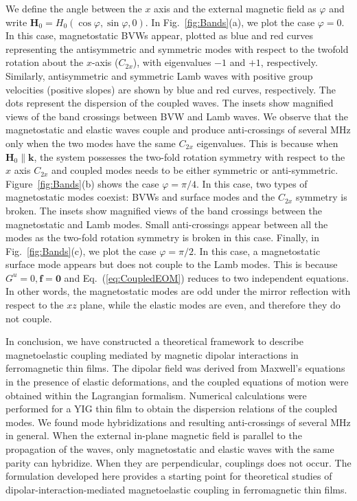 \documentclass[10pt]{iopart}
\begin{document}
We define the angle between the $x$ axis and the external magnetic field as $\varphi$ and write $\bm{H}_0=H_0(\cos\varphi,\sin\varphi,0)$. In Fig.~\ref{fig:Bands}(a), we plot the case $\varphi=0$. In this case, magnetostatic BVWs appear, plotted as blue and red curves representing the antisymmetric and symmetric modes with respect to the twofold rotation about the $x$-axis ($C_{2x}$), with eigenvalues $-1$ and $+1$, respectively. Similarly, antisymmetric and symmetric Lamb waves with positive group velocities (positive slopes) are shown by blue and red curves, respectively. The dots represent the dispersion of the coupled waves. The insets show magnified views of the band crossings between BVW and Lamb waves. We observe that the magnetostatic and elastic waves couple and produce anti-crossings of several MHz only when the two modes have the same $C_{2x}$ eigenvalues. This is because when $\bm{H}_0\parallel\bm{k}$, the system possesses the two-fold rotation symmetry with respect to the $x$ axis $C_{2x}$ and coupled modes needs to be either symmetric or anti-symmetric. Figure~\ref{fig:Bands}(b) shows the case $\varphi=\pi/4$. In this case, two types of magnetostatic modes coexist: BVWs and surface modes and the $C_{2x}$ symmetry is broken. The insets show magnified views of the band crossings between the magnetostatic and Lamb modes. Small anti-crossings appear between all the modes as the two-fold rotation symmetry is broken in this case. Finally, in Fig.~\ref{fig:Bands}(c), we plot the case $\varphi=\pi/2$. In this case, a magnetostatic surface mode appears but does not couple to the Lamb modes. This is because $G^u=0,\bm{f}=\bm{0}$ and Eq.~(\ref{eq:CoupledEOM}) reduces to two independent equations. In other words, the magnetostatic modes are odd under the mirror reflection with respect to the $xz$ plane, while the elastic modes are even, and therefore they do not couple.

In conclusion, we have constructed a theoretical framework to describe magnetoelastic coupling mediated by magnetic dipolar interactions in ferromagnetic thin films. The dipolar field was derived from Maxwell's equations in the presence of elastic deformations, and the coupled equations of motion were obtained within the Lagrangian formalism. Numerical calculations were performed for a YIG thin film to obtain the dispersion relations of the coupled modes. We found mode hybridizations and resulting anti-crossings of several MHz in general. When the external in-plane magnetic field is parallel to the propagation of the waves, only magnetostatic and elastic waves with the same parity can hybridize. When they are perpendicular, couplings does not occur. The formulation developed here provides a starting point for theoretical studies of dipolar-interaction-mediated magnetoelastic coupling in ferromagnetic thin films.




\end{document}
